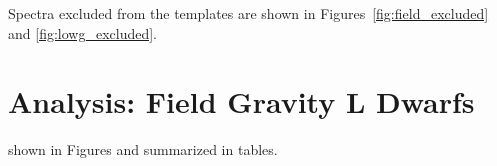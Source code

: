 \documentclass[12pt,preprint]{aastex}
\begin{document}
Spectra excluded from the templates are shown in Figures~\ref{fig:field_excluded} and \ref{fig:lowg_excluded}.




\clearpage
\section{Analysis: Field Gravity L Dwarfs}
\label{sec:fieldg}

shown in Figures and summarized in tables.


\end{document}
